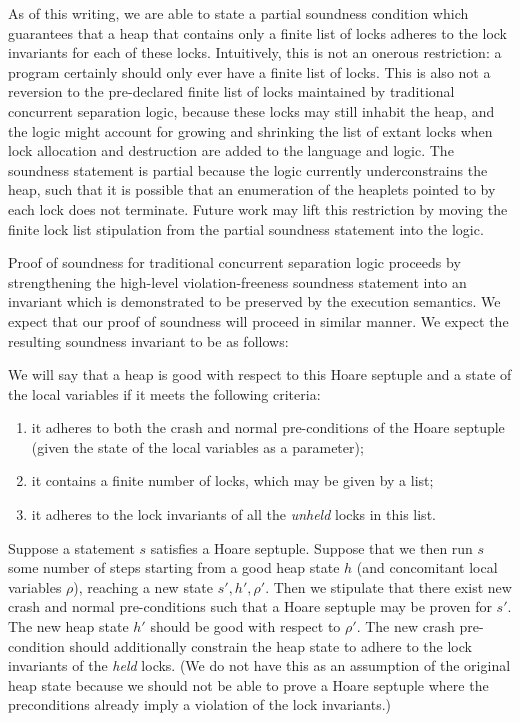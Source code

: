 As of this writing, we are able to state a partial soundness condition
which guarantees that a heap that contains only a finite list of locks
adheres to the lock invariants for each of these locks.
Intuitively, this is not an onerous restriction:
a program certainly should only ever have a finite list of locks.
This is also not a reversion to the pre-declared finite list of locks
maintained by traditional concurrent separation logic, because these locks may
still inhabit the heap, and the logic might account for growing and shrinking
the list of extant locks when lock allocation and destruction are
added to the language and logic.
The soundness statement is partial because the logic currently underconstrains
the heap, such that
it is possible that an enumeration of the heaplets pointed to by each lock
does not terminate.
Future work may lift this restriction by
moving the finite lock list stipulation from the partial soundness statement
into the logic.

Proof of soundness for traditional concurrent separation logic proceeds by
strengthening the high-level violation-freeness soundness statement into
an invariant which is demonstrated to be preserved by the execution semantics.
We expect that our proof of soundness will proceed in similar manner.
We expect the resulting soundness invariant to be as follows:

We will say that a heap is good with respect to this Hoare septuple
and a state of the local variables
if it meets the following criteria:
\begin{enumerate}
\item it adheres to both the crash and normal pre-conditions
of the Hoare septuple
(given the state of the local variables as a parameter);
\item it contains a finite number of locks, which may be given by a list;
\item it adheres to the lock invariants of all the \emph{unheld} locks
in this list.
\end{enumerate}
Suppose a statement $s$ satisfies a Hoare septuple.
Suppose that we then run $s$ some number of steps starting from
a good heap state $h$ (and concomitant local variables $\rho$),
reaching a new state $s', h', \rho'$.
Then we stipulate that there exist new crash and normal pre-conditions
such that a Hoare septuple may be proven for $s'$.
The new heap state $h'$ should be good with respect to $\rho'$.
The new crash pre-condition should additionally constrain the heap state
to adhere to the lock invariants of the \emph{held} locks.
(We do not have this as an assumption of the original heap state because
we should not be able to prove a Hoare septuple where the preconditions
already imply a violation of the lock invariants.)

